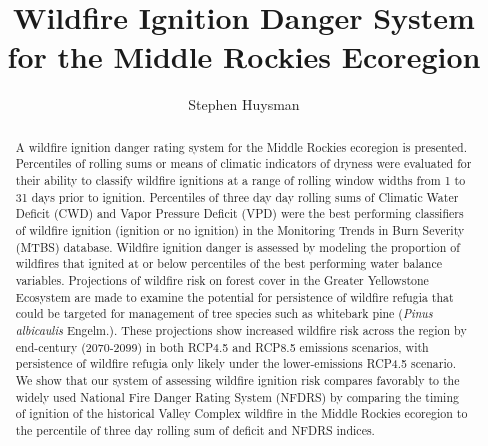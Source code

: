\documentclass[11p]{article}
\author{Stephen Huysman}
\title{Wildfire Ignition Danger System for the Middle Rockies Ecoregion}
\begin{document}
\maketitle


\begin{abstract}
  
A wildfire ignition danger rating system for the Middle Rockies ecoregion is presented. Percentiles of rolling sums or means of climatic indicators of dryness were evaluated for their ability to classify wildfire ignitions at a range of rolling window widths from 1 to 31 days prior to ignition. Percentiles of three day day rolling sums of Climatic Water Deficit (CWD) and Vapor Pressure Deficit (VPD) were the best performing classifiers of wildfire ignition (ignition or no ignition) in the Monitoring Trends in Burn Severity (MTBS) database. Wildfire ignition danger is assessed by modeling the proportion of wildfires that ignited at or below percentiles of the best performing water balance variables. Projections of wildfire risk on forest cover in the Greater Yellowstone Ecosystem are made to examine the potential for persistence of wildfire refugia that could be targeted for management of tree species such as whitebark pine (\textit{Pinus albicaulis} Engelm.). These projections show increased wildfire risk across the region by end-century (2070-2099) in both RCP4.5 and RCP8.5 emissions scenarios, with persistence of wildfire refugia only likely under the lower-emissions RCP4.5 scenario. We show that our system of assessing wildfire ignition risk compares favorably to the widely used National Fire Danger Rating System (NFDRS) by comparing the timing of ignition of the historical Valley Complex wildfire in the Middle Rockies ecoregion to the percentile of three day rolling sum of deficit and NFDRS indices.
  
\end{abstract}
\end{document}
